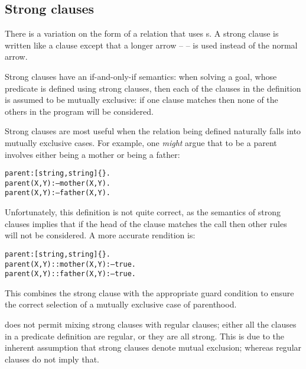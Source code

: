 \subsection{Strong clauses}
\label{program:clause:strong}
There is a variation on the form of a relation that uses s. A strong clause is written like a clause except that a longer arrow -- \q{:--} -- is used instead of the normal arrow.

Strong clauses have an if-and-only-if semantics: when solving a goal, whose predicate is defined using strong clauses, then each of the clauses in the definition is assumed to be mutually exclusive: if one clause matches then none of the others in the program will be considered.

Strong clauses are most useful when the relation being defined naturally falls into mutually exclusive cases. For example, one \emph{might} argue that to be a parent involves either being a mother or being a father:
\begin{alltt}
parent:[string,string]\{\}.
parent(X,Y) :-- mother(X,Y).
parent(X,Y) :-- father(X,Y).
\end{alltt}
Unfortunately, this definition is not quite correct, as the semantics of strong clauses implies that if the head of the clause matches the call then other rules will not be considered. A more accurate rendition is:
\begin{alltt}
parent:[string,string]\{\}.
parent(X,Y) :: mother(X,Y) :-- true.
parent(X,Y) :: father(X,Y) :-- true.
\end{alltt}
This combines the strong clause with the appropriate guard condition to ensure the correct selection of a mutually exclusive case of parenthood.

\go does not permit mixing strong clauses with regular clauses; either all the clauses in a predicate definition are regular, or they are all strong. This is due to the inherent assumption that strong clauses denote mutual exclusion; whereas regular clauses do not imply that.

